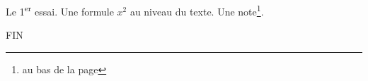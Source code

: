 \documentclass{article}
\begin{document}
\ifdefined\SANSEXPOSANT\else Le 1\textsuperscript{er} essai.\fi
\ifdefined\MATHS Une formule $x^2$ au niveau du texte.\fi
\ifdefined\NOTE Une note\footnote{au bas de la page}.\fi

FIN
\end{document}
